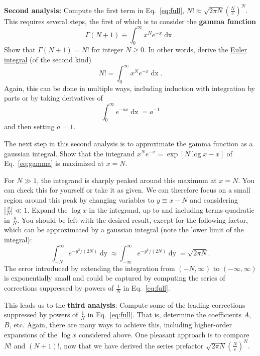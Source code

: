 \documentclass[12 pt]{article} %
\newcommand{\Ga}{\ensuremath{\Gamma} }
\renewcommand{\d}[1]{\ensuremath{\mathop{d#1}} }
\newcommand{\eq}[1]{Eq.~\ref{#1}}
\begin{document}
\textbf{Second analysis:} Compute the first term in \eq{eq:full}, $N! \approx \sqrt{2\pi N} \left(\frac{N}{e}\right)^N$.
This requires several steps, the first of which is to consider the \textbf{gamma function}
\begin{equation*}
  \Ga(N + 1) \equiv \int_0^{\infty} x^N e^{-x} \d{x}.
\end{equation*}
Show that $\Ga(N + 1) = N!$ for integer $N \geq 0$.
In other words, derive the \href{https://en.wikipedia.org/wiki/Euler_integral}{Euler integral} (of the second kind)
\begin{equation}
  \label{eq:gamma}
  N! = \int_0^{\infty} x^N e^{-x} \d{x}.
\end{equation}
Again, this can be done in multiple ways, including induction with integration by parts or by taking derivatives of
\begin{equation*}
  \int_0^{\infty} e^{-ax} \d{x} = a^{-1}
\end{equation*}
and then setting $a = 1$.

\newpage
The next step in this second analysis is to approximate the gamma function as a gaussian integral.
Show that the integrand $x^N e^{-x} = \exp\left[N\log x - x\right]$ of \eq{eq:gamma} is maximized at $x = N$.

For $N \gg 1$, the integrand is sharply peaked around this maximum at $x = N$.
You can check this for yourself or take it as given.
We can therefore focus on a small region around this peak by changing variables to $y \equiv x - N$ and considering $\left|\frac{y}{N}\right| \ll 1$.
Expand the $\log x$ in the integrand, up to and including terms quadratic in $\frac{y}{N}$.
You should be left with the desired result, except for the following factor, which can be approximated by a gaussian integral (note the lower limit of the integral):
\begin{equation*}
  \int_{-N}^{\infty} e^{-y^2 / (2N)} \d{y} \approx \int_{-\infty}^{\infty} e^{-y^2 / (2N)} \d{y} = \sqrt{2\pi N}.
\end{equation*}
The error introduced by extending the integration from $(-N, \infty)$ to  $(-\infty, \infty)$ is exponentially small and could be captured by computing the series of corrections suppressed by powers of $\frac{1}{N}$ in \eq{eq:full}.

This leads us to the \textbf{third analysis}: Compute some of the leading corrections suppressed by powers of $\frac{1}{N}$ in \eq{eq:full}.
That is, determine the coefficients $A$, $B$, etc.
Again, there are many ways to achieve this, including higher-order expansions of the $\log x$ considered above.
One pleasant approach is to compare $N!$ and $(N + 1)!$, now that we have derived the series prefactor $\sqrt{2\pi N} \left(\frac{N}{e}\right)^N$.
\end{document}
